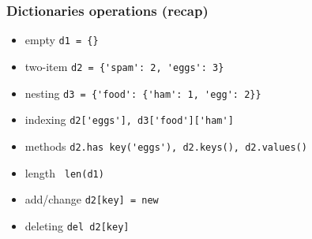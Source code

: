 \begin{frame}[fragile]\frametitle{Dictionaries operations (recap)}
  \begin{itemize}
  \item empty  \lstinline|d1 = {}|
  \item two-item \lstinline|d2 = {'spam': 2, 'eggs': 3}|
  \item nesting \lstinline|d3 = {'food': {'ham': 1, 'egg': 2}}|
  \item indexing \lstinline|d2['eggs'], d3['food']['ham']|
  \item methods \lstinline|d2.has key('eggs'), d2.keys(), d2.values()|
  \item length \lstinline| len(d1)|
  \item add/change \lstinline|d2[key] = new|
  \item deleting \lstinline|del d2[key]|
  \end{itemize}
\end{frame}